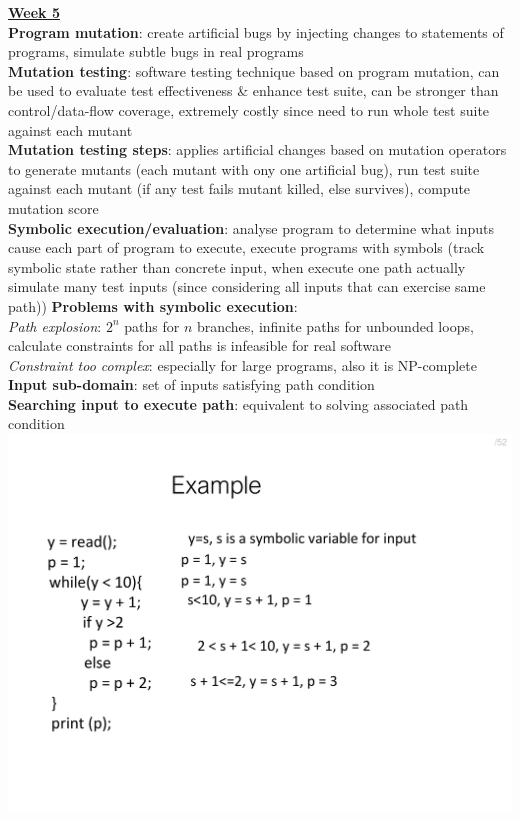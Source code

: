 \documentclass[a4paper]{article}
\begin{document}
\begin{multicols}{3}
        \underline{\textbf{Week 5}}\\
        \textbf{Program mutation}: create artificial bugs by injecting changes to statements of programs, simulate subtle bugs in real programs\\
        \textbf{Mutation testing}: software testing technique based on program mutation, can be used to evaluate test effectiveness \& enhance test suite, can be stronger than control/data-flow coverage, extremely costly since need to run whole test suite against each mutant\\
        \textbf{Mutation testing steps}: applies artificial changes based on mutation operators to generate mutants (each mutant with ony one artificial bug), run test suite against each mutant (if any test fails mutant killed, else survives), compute mutation score\\
        \textbf{Symbolic execution/evaluation}: analyse program to determine what inputs cause each part of program to execute, execute programs with symbols (track symbolic state rather than concrete input, when execute one path actually simulate many test inputs (since considering all inputs that can exercise same path))
        \textbf{Problems with symbolic execution}:\\
        \textit{Path explosion}: $2^n$ paths for $n$ branches, infinite paths for unbounded loops, calculate constraints for all paths is infeasible for real software\\
        \textit{Constraint too complex}: especially for large programs, also it is NP-complete\\
        \textbf{Input sub-domain}: set of inputs satisfying path condition\\
        \textbf{Searching input to execute path}: equivalent to solving associated path condition\\
        \includegraphics[width=\linewidth]{242.pdf}\\
    \end{multicols}
    
\end{document}
